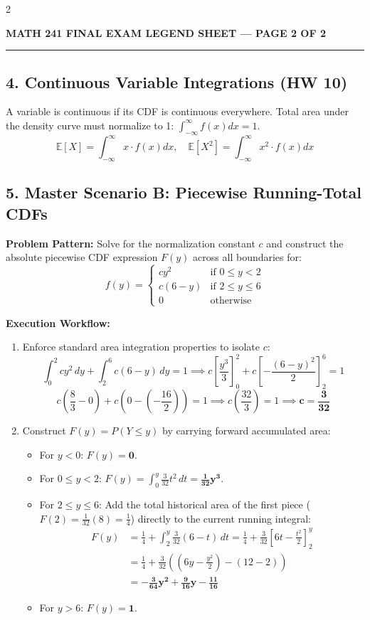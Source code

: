 \documentclass[9pt,landscape]{article}
\newcommand{\E}{\mathbb{E}}
\begin{document}
\begin{multicols*}{2}
\newpage
\begin{center}
    \large\textbf{\color{red}MATH 241 FINAL EXAM LEGEND SHEET --- PAGE 2 OF 2}
\end{center}
\vskip 1pt
\hrule
\vskip 4pt

\subsection*{4. Continuous Variable Integrations (HW 10)}
A variable is continuous if its CDF is continuous everywhere. Total area under the density curve must normalize to 1: $\int_{-\infty}^{\infty} f(x)dx = 1$.
$$\E[X] = \int_{-\infty}^{\infty} x \cdot f(x)dx, \quad \E[X^2] = \int_{-\infty}^{\infty} x^2 \cdot f(x)dx$$

\subsection*{5. Master Scenario B: Piecewise Running-Total CDFs}
\textbf{Problem Pattern:} Solve for the normalization constant $c$ and construct the absolute piecewise CDF expression $F(y)$ across all boundaries for:
$$f(y) = \begin{cases} c y^2 & \text{if } 0 \le y < 2 \\ c(6 - y) & \text{if } 2 \le y \le 6 \\ 0 & \text{otherwise} \end{cases}$$

\textbf{Execution Workflow:}
\begin{enumerate}
    \item Enforce standard area integration properties to isolate $c$:
    $$\int_{0}^{2} cy^2 \,dy + \int_{2}^{6} c(6-y) \,dy = 1 \implies c\left[\frac{y^3}{3}\right]_0^2 + c\left[-\frac{(6-y)^2}{2}\right]_2^6 = 1$$
    $$c\left(\frac{8}{3} - 0\right) + c\left(0 - \left(-\frac{16}{2}\right)\right) = 1 \implies c\left(\frac{32}{3}\right) = 1 \implies \mathbf{c = \frac{3}{32}}$$
    \item Construct $F(y) = P(Y \le y)$ by carrying forward accumulated area:
    \begin{itemize}
        \item For $y < 0$: $F(y) = \mathbf{0}$.
        \item For $0 \le y < 2$: $F(y) = \int_0^y \frac{3}{32}t^2\,dt = \mathbf{\frac{1}{32}y^3}$.
        \item For $2 \le y \le 6$: Add the total historical area of the first piece ($F(2) = \frac{1}{32}(8) = \frac{1}{4}$) directly to the current running integral:
        \begin{align*}
        F(y) &= \frac{1}{4} + \int_2^y \frac{3}{32}(6-t)\,dt = \frac{1}{4} + \frac{3}{32}\left[6t - \frac{t^2}{2}\right]_2^y \\
        &= \frac{1}{4} + \frac{3}{32}\left(\left(6y - \frac{y^2}{2}\right) - (12 - 2)\right) \\
        &= \mathbf{-\frac{3}{64}y^2 + \frac{9}{16}y - \frac{11}{16}}
        \end{align*}
        \item For $y > 6$: $F(y) = \mathbf{1}$.
    \end{itemize}
\end{enumerate}


\end{multicols*}
\end{document}
